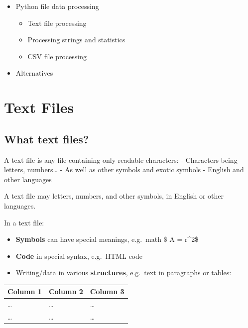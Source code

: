 \documentclass[
  letterpaper,
]{scrbook}
\newcounter{none} %
\providecommand{\tightlist}{%
  \setlength{\itemsep}{0pt}\setlength{\parskip}{0pt}}
\begin{document}
\begin{itemize}
\tightlist
\item
  Python file data processing

  \begin{itemize}
  \tightlist
  \item
    Text file processing
  \item
    Processing strings and statistics
  \item
    CSV file processing
  \end{itemize}
\item
  Alternatives
\end{itemize}

\section*{Text Files}\label{text-files}


\subsection*{What text files?}\label{what-text-files}

A text file is any file containing only readable characters: -
Characters being letters, numbers\ldots{} - As well as other symbols and
exotic symbols - English and other languages

A text file may letters, numbers, and other symbols, in English or other
languages.

In a text file:

\begin{itemize}
\item
  \textbf{Symbols} can have special meanings, e.g.~math \$ A =
  \pi r\^{}2\$
\item
  \textbf{Code} in special syntax, e.g.~HTML code
\item
  Writing/data in various \textbf{structures}, e.g.~text in paragraphs
  or tables:
\end{itemize}

{\def\LTcaptype{none} %
\begin{longtable}[]{@{}lll@{}}
\toprule\noalign{}
Column 1 & Column 2 & Column 3 \\
\midrule\noalign{}
\endhead
\bottomrule\noalign{}
\endlastfoot
\ldots{} & \ldots{} & \ldots{} \\
\ldots{} & \ldots{} & \ldots{} \\
\end{longtable}
}
\end{document}
